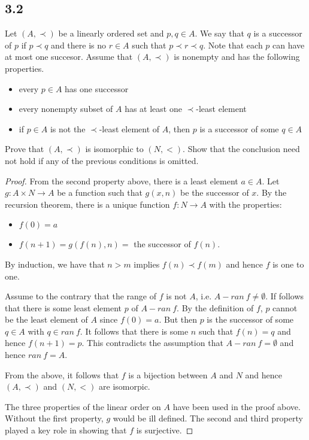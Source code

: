 \subsection*{3.2} Let $(A, \prec)$ be a linearly ordered set and $p,q \in A$. We say that $q$ is a successor of $p$ if $p \prec q$ and there is no $r \in A$ such that $p \prec r \prec q$. Note that each $p$ can have at most one succesor. Assume that $(A, \prec)$ is nonempty and has the following properties.

\begin{itemize}
    \item every $p \in A$ has one successor
    \item every nonempty subset of $A$ has at least one $\prec$-least element
    \item if $p \in A$ is not the $\prec$-least element of $A$, then $p$ is a successor of some $q \in A$
\end{itemize}

Prove that $(A, \prec)$ is isomorphic to $(N, <)$. Show that the conclusion need not hold if any of the previous conditions is omitted.

\begin{proof}
From the second property above, there is a least element $a \in A$. Let $g: A \times N \rightarrow A$ be a function such that $g(x, n)$ be the successor of $x$. By the recursion theorem, there is a unique function $f:N \rightarrow A$ with the properties:

\begin{itemize}
    \item $f(0) = a$
    \item $f(n+1) = g(f(n), n) =$ the successor of $f(n)$.
\end{itemize}

By induction, we have that $n > m$ implies $f(n) \prec f(m)$ and hence $f$ is one to one.

Assume to the contrary that the range of $f$ is not $A$, i.e. $A - ran~f \neq \emptyset$. If follows that there is some least element $p$ of $A - ran~f$. By the definition of $f$, $p$ cannot be the least element of $A$ since $f(0) = a$. But then $p$ is the successor of some $q \in A$ with $q \in ran~f$. It follows that there is some $n$ such that $f(n) = q$ and hence $f(n+1) = p$. This contradicts the assumption that $A - ran~f = \emptyset$ and hence $ran~f = A$.

From the above, it follows that $f$ is a bijection between $A$ and $N$ and hence $(A, \prec)$ and $(N, <)$ are isomorpic.

\vspace{1em}

The three properties of the linear order on $A$ have been used in the proof above. Without the first property, $g$ would be ill defined. The second and third property played a key role in showing that $f$ is surjective.

\end{proof}

\newpage

